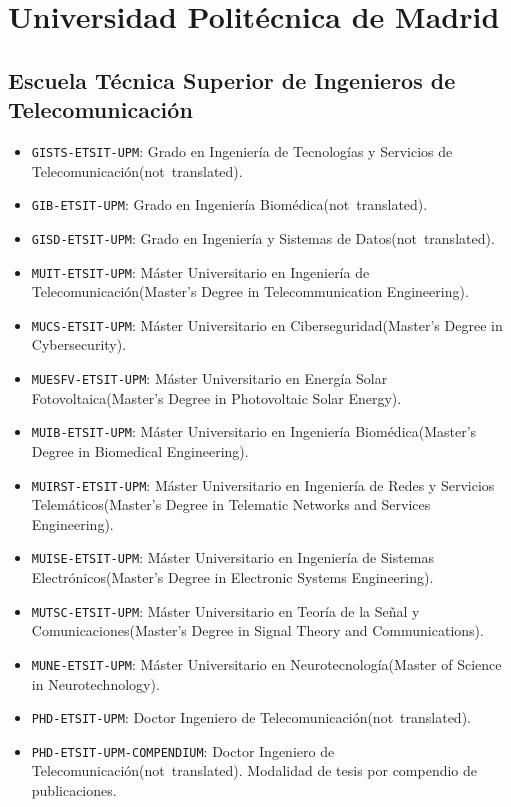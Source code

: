 \section {Universidad Politécnica de Madrid}
\subsection {Escuela Técnica Superior de Ingenieros de Telecomunicación}
\begin {itemize}
\item \texttt {GISTS-ETSIT-UPM}: Grado en Ingeniería de Tecnologías y Servicios de Telecomunicación\nobreakspace {}(\mbox {not translated}).
\item \texttt {GIB-ETSIT-UPM}: Grado en Ingeniería Biomédica\nobreakspace {}(\mbox {not translated}).
\item \texttt {GISD-ETSIT-UPM}: Grado en Ingeniería y Sistemas de Datos\nobreakspace {}(\mbox {not translated}).
\item \texttt {MUIT-ETSIT-UPM}: Máster Universitario en Ingeniería de Telecomunicación\nobreakspace {}(Master's Degree in Telecommunication Engineering).
\item \texttt {MUCS-ETSIT-UPM}: Máster Universitario en Ciberseguridad\nobreakspace {}(Master's Degree in Cybersecurity).
\item \texttt {MUESFV-ETSIT-UPM}: Máster Universitario en Energía Solar Fotovoltaica\nobreakspace {}(Master's Degree in Photovoltaic Solar Energy).
\item \texttt {MUIB-ETSIT-UPM}: Máster Universitario en Ingeniería Biomédica\nobreakspace {}(Master's Degree in Biomedical Engineering).
\item \texttt {MUIRST-ETSIT-UPM}: Máster Universitario en Ingeniería de Redes y Servicios Telemáticos\nobreakspace {}(Master's Degree in Telematic Networks and Services Engineering).
\item \texttt {MUISE-ETSIT-UPM}: Máster Universitario en Ingeniería de Sistemas Electrónicos\nobreakspace {}(Master's Degree in Electronic Systems Engineering).
\item \texttt {MUTSC-ETSIT-UPM}: Máster Universitario en Teoría de la Señal y Comunicaciones\nobreakspace {}(Master's Degree in Signal Theory and Communications).
\item \texttt {MUNE-ETSIT-UPM}: Máster Universitario en Neurotecnología\nobreakspace {}(Master of Science in Neurotechnology).
\item \texttt {PHD-ETSIT-UPM}: Doctor Ingeniero de Telecomunicación\nobreakspace {}(\mbox {not translated}).
\item \texttt {PHD-ETSIT-UPM-COMPENDIUM}: Doctor Ingeniero de Telecomunicación\nobreakspace {}(\mbox {not translated}). Modalidad de tesis por compendio de publicaciones.
\end {itemize}
